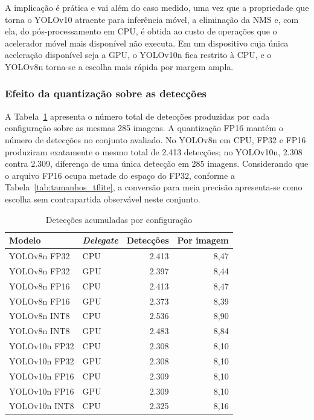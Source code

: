\documentclass[artigo,times,capa]{iftex2024}
\begin{document}
A implicação é prática e vai além do caso medido, uma vez que a propriedade que torna o YOLOv10 atraente para inferência móvel, a eliminação da \ac{NMS} e, com ela, do pós-processamento em \ac{CPU}, é obtida ao custo de operações que o acelerador móvel mais disponível não executa. Em um dispositivo cuja única aceleração disponível seja a \ac{GPU}, o YOLOv10n fica restrito à \ac{CPU}, e o YOLOv8n torna-se a escolha mais rápida por margem ampla.

\subsubsection{Efeito da quantização sobre as detecções}
\label{sec:efeito_quantizacao}

A Tabela~\ref{tab:deteccoes_dispositivo} apresenta o número total de detecções produzidas por cada configuração sobre as mesmas 285 imagens. A quantização \ac{FP16} mantém o número de detecções no conjunto avaliado. No YOLOv8n em \ac{CPU}, \ac{FP32} e \ac{FP16} produziram exatamente o mesmo total de 2.413 detecções; no YOLOv10n, 2.308 contra 2.309, diferença de uma única detecção em 285 imagens. Considerando que o arquivo \ac{FP16} ocupa metade do espaço do \ac{FP32}, conforme a Tabela~\ref{tab:tamanhos_tflite}, a conversão para meia precisão apresenta-se como escolha sem contrapartida observável neste conjunto.

\begin{table}[htbp]
\centering
\caption{Detecções acumuladas por configuração}
\label{tab:deteccoes_dispositivo}
\begin{tabular}{llrr}
\toprule
\textbf{Modelo} & \textbf{\textit{Delegate}} & \textbf{Detecções} & \textbf{Por imagem} \\
\midrule
YOLOv8n \ac{FP32} & \ac{CPU} & 2.413 & 8,47 \\
YOLOv8n \ac{FP32} & \ac{GPU} & 2.397 & 8,44 \\
YOLOv8n \ac{FP16} & \ac{CPU} & 2.413 & 8,47 \\
YOLOv8n \ac{FP16} & \ac{GPU} & 2.373 & 8,39 \\
YOLOv8n \ac{INT8} & \ac{CPU} & 2.536 & 8,90 \\
YOLOv8n \ac{INT8} & \ac{GPU} & 2.483 & 8,84 \\
\midrule
YOLOv10n \ac{FP32} & \ac{CPU} & 2.308 & 8,10 \\
YOLOv10n \ac{FP32} & \ac{GPU} & 2.308 & 8,10 \\
YOLOv10n \ac{FP16} & \ac{CPU} & 2.309 & 8,10 \\
YOLOv10n \ac{FP16} & \ac{GPU} & 2.309 & 8,10 \\
YOLOv10n \ac{INT8} & \ac{CPU} & 2.325 & 8,16 \\
\bottomrule
\end{tabular}
\end{table}
\end{document}
